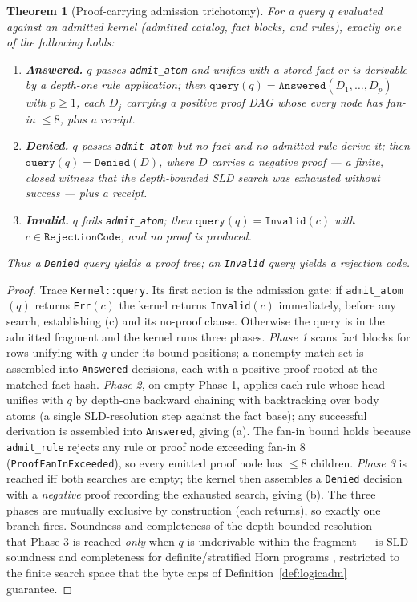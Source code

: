 \documentclass[11pt,oneside]{book}
\theoremstyle{definition}
\theoremstyle{plain}
\newtheorem{theorem}{Theorem}[chapter]
\theoremstyle{remark}
\newcommand{\code}[1]{\texttt{#1}}
\begin{document}
\begin{theorem}[Proof-carrying admission trichotomy]\label{thm:trichotomy}
For a query $q$ evaluated against an admitted kernel (admitted catalog, fact blocks, and rules), exactly one of the following holds: %
\begin{enumerate}[label=(\alph*),leftmargin=*]
\item \textbf{Answered.} $q$ passes \code{admit\_atom} and unifies with a stored fact or is derivable by a depth-one rule application; then $\code{query}(q)=\code{Answered}(D_1,\dots,D_p)$ with $p\ge 1$, each $D_j$ carrying a \emph{positive} proof DAG whose every node has fan-in $\le 8$, plus a receipt. %
\item \textbf{Denied.} $q$ passes \code{admit\_atom} but no fact and no admitted rule derive it; then $\code{query}(q)=\code{Denied}(D)$, where $D$ carries a \emph{negative} proof --- a finite, closed witness that the depth-bounded SLD search was exhausted without success --- plus a receipt. %
\item \textbf{Invalid.} $q$ fails \code{admit\_atom}; then $\code{query}(q)=\code{Invalid}(c)$ with $c\in\code{RejectionCode}$, and \emph{no proof is produced}. %
\end{enumerate}
Thus a \code{Denied} query yields a proof tree; an \code{Invalid} query yields a rejection code. %
\end{theorem}

\begin{proof}
Trace \code{Kernel::query}. %
Its first action is the admission gate: if \code{admit\_atom}$(q)$ returns \code{Err}$(c)$ the kernel returns \code{Invalid}$(c)$ immediately, before any search, establishing (c) and its no-proof clause. %
Otherwise the query is in the admitted fragment and the kernel runs three phases. %
\emph{Phase 1} scans fact blocks for rows unifying with $q$ under its bound positions; a nonempty match set is assembled into \code{Answered} decisions, each with a positive proof rooted at the matched fact hash. %
\emph{Phase 2}, on empty Phase 1, applies each rule whose head unifies with $q$ by depth-one backward chaining with backtracking over body atoms (a single SLD-resolution step against the fact base); any successful derivation is assembled into \code{Answered}, giving (a). %
The fan-in bound holds because \code{admit\_rule} rejects any rule or proof node exceeding fan-in $8$ (\code{ProofFanInExceeded}), so every emitted proof node has $\le 8$ children. %
\emph{Phase 3} is reached iff both searches are empty; the kernel then assembles a \code{Denied} decision with a \emph{negative} proof recording the exhausted search, giving (b). %
The three phases are mutually exclusive by construction (each returns), so exactly one branch fires. %
Soundness and completeness of the depth-bounded resolution --- that Phase 3 is reached \emph{only} when $q$ is underivable within the fragment --- is SLD soundness and completeness for definite/stratified Horn programs \cite{kowalski1974,lloyd1987}, restricted to the finite search space that the byte caps of Definition~\ref{def:logicadm} guarantee. %
\end{proof}
\end{document}
